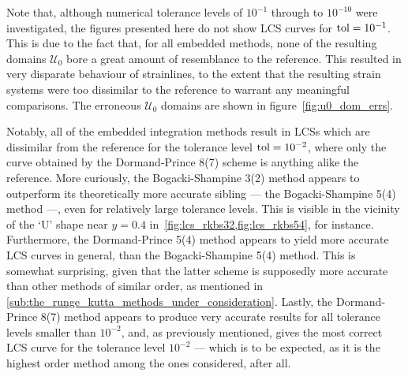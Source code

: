 Note that, although numerical tolerance levels of $10^{-1}$ through to
$10^{-10}$ were investigated, the figures presented here do not show LCS curves
for $\textnormal{tol}=10^{-1}$. This is due to the fact that, for all
embedded methods, none of the resulting domains $\mathcal{U}_{0}$ bore
a great amount of resemblance to the reference. This resulted in very disparate
behaviour of strainlines, to the extent that the resulting strain systems were
too dissimilar to the reference to warrant any meaningful comparisons. The
erroneous $\mathcal{U}_{0}$ domains are shown in figure~\ref{fig:u0_dom_errs}.

Notably, all of the embedded integration methods result in LCSs which are
dissimilar from the reference for the tolerance level $\textnormal{tol}=10^{-2}$,
where only the curve obtained by the Dormand-Prince 8(7) scheme is anything
alike the reference. More curiously, the Bogacki-Shampine 3(2) method appears
to outperform its theoretically more accurate sibling --- the
Bogacki-Shampine 5(4) method ---, even for relatively
large tolerance levels. This is visible in the
vicinity of the `U' shape near $y=0.4$ in~\cref{fig:lcs_rkbs32,fig:lcs_rkbs54},
for instance. Furthermore, the Dormand-Prince 5(4) method appears to yield more
accurate LCS curves in general, than the Bogacki-Shampine 5(4) method. This
is somewhat surprising, given that the latter scheme is supposedly more accurate
than other methods of similar order, as mentioned in
\cref{sub:the_runge_kutta_methods_under_consideration}. Lastly, the
Dormand-Prince 8(7) method appears to produce very accurate results for all
tolerance levels smaller than $10^{-2}$, and, as previously mentioned, gives
the most correct LCS curve for the tolerance level $10^{-2}$
--- which is to be expected, as it is the highest order method among the ones
considered, after all.









